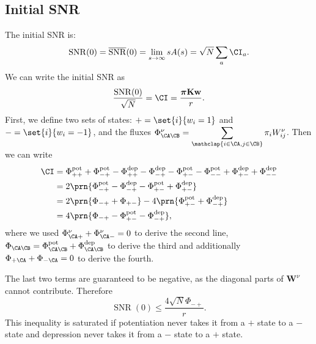 \documentclass[12pt]{article}
\newcommand{\eqm}{\pi}
\newcommand{\eq}{\boldsymbol{\eqm}}
\newcommand{\wm}{w}
\newcommand{\w}{\mathbf{\wm}}
\newcommand{\Wm}{W}
\newcommand{\W}{\mathbf{\Wm}}
\newcommand{\encm}{K}
\newcommand{\enc}{\mathbf{\encm}}
\newcommand{\Fm}{\Phi}
\newcommand{\pot}{^{\text{pot}}}
\newcommand{\dep}{^{\text{dep}}}
\DeclareMathOperator{\SNR}{SNR}
\DeclareMathOperator{\snr}{SNR}
\newcommand{\snrb}{\overline{\snr}}
\begin{document}

\subsection{Initial SNR}\label{sec:initial}

The initial SNR is:
%
\begin{equation}\label{eq:initdef}
  \snr(0) = \snrb(0) = \lim_{s\to\infty} sA(s)
      = \sqrt{N} \sum_a \CI_a.
\end{equation}
%
We can write the initial SNR as
%
\begin{equation*}
  \frac{\SNR(0)}{\sqrt{N}} = \CI = \frac{\eq \enc \w}{r}.
\end{equation*}
%
First, we define two sets of states: \( + = \set{i}{\wm_i = 1} \) and \( - = \set{i}{\wm_i = - 1} \), and the fluxes \( \Fm^\nu_{\CA \CB} = \displaystyle\sum_{\mathclap{i \in \CA, j \in \CB}} \eqm_i \Wm^\nu_{ij} \).
Then we can write
%
\begin{equation*}
\begin{aligned}
  \CI &= \Fm\pot_{++} + \Fm\pot_{-+} - \Fm\dep_{++} - \Fm\dep_{-+} - \Fm\pot_{+-} - \Fm\pot_{--} + \Fm\dep_{+-} + \Fm\dep_{--} \\
      &= 2\prn{\Fm\pot_{-+} - \Fm\dep_{-+} - \Fm\pot_{+-} + \Fm\dep_{+-}} \\
      &= 2\prn{\Fm_{-+} + \Fm_{+-}} - 4\prn{\Fm\pot_{+-} + \Fm\dep_{-+}} \\
      &= 4\prn{\Fm_{-+} - \Fm\pot_{+-} - \Fm\dep_{-+}}, \\
\end{aligned}
\end{equation*}
%
where we used \( \Fm^\nu_{\CA+} + \Fm^\nu_{\CA-} = 0 \) to derive the second line, \( \Fm_{\CA\CB} = \Fm\pot_{\CA\CB} + \Fm\dep_{\CA\CB} \) to derive the third and additionally \( \Fm_{+\CA} + \Fm_{-\CA} = 0 \) to derive the fourth.

The last two terms are guaranteed to be negative, as the diagonal parts of \(\W^\nu \) cannot contribute.
Therefore
%
\begin{equation}\label{eq:initfluxineq}
  \SNR(0) \leq \frac{4\sqrt{N}\Fm_{-+}}{r}.
\end{equation}
%
This inequality is saturated if potentiation never takes it from a \(+\) state to a \(-\) state and depression never takes it from a \(-\) state to a \(+\) state.
\end{document}
